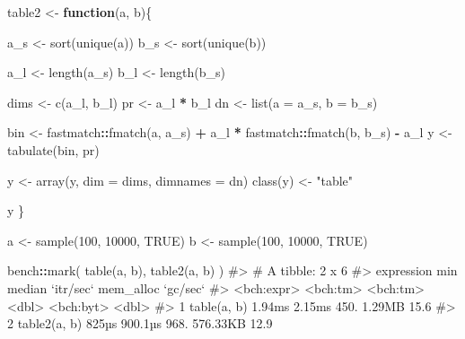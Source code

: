 \documentclass[
]{krantz}
\makeatletter
\newenvironment{Shaded}{\begin{snugshade}}{\end{snugshade}}
\newcommand{\CommentTok}[1]{\textcolor[rgb]{0.56,0.35,0.01}{\textit{#1}}}
\newcommand{\ControlFlowTok}[1]{\textcolor[rgb]{0.13,0.29,0.53}{\textbf{#1}}}
\newcommand{\DataTypeTok}[1]{\textcolor[rgb]{0.13,0.29,0.53}{#1}}
\newcommand{\DecValTok}[1]{\textcolor[rgb]{0.00,0.00,0.81}{#1}}
\newcommand{\KeywordTok}[1]{\textcolor[rgb]{0.13,0.29,0.53}{\textbf{#1}}}
\newcommand{\NormalTok}[1]{#1}
\newcommand{\OperatorTok}[1]{\textcolor[rgb]{0.81,0.36,0.00}{\textbf{#1}}}
\newcommand{\OtherTok}[1]{\textcolor[rgb]{0.56,0.35,0.01}{#1}}
\newcommand{\StringTok}[1]{\textcolor[rgb]{0.31,0.60,0.02}{#1}}
\newenvironment{kframe}{%
\medskip{}
\setlength{\fboxsep}{.8em}
 \def\at@end@of@kframe{}%
 \ifinner\ifhmode%
  \def\at@end@of@kframe{\end{minipage}}%
  \begin{minipage}{\columnwidth}%
 \fi\fi%
 \def\FrameCommand##1{\hskip\@totalleftmargin \hskip-\fboxsep
 \colorbox{shadecolor}{##1}\hskip-\fboxsep
     \hskip-\linewidth \hskip-\@totalleftmargin \hskip\columnwidth}%
 \MakeFramed {\advance\hsize-\width
   \@totalleftmargin\z@ \linewidth\hsize
   \@setminipage}}%
 {\par\unskip\endMakeFramed%
 \at@end@of@kframe}
\renewenvironment{Shaded}{\begin{kframe}}{\end{kframe}}
\renewcommand{\KeywordTok} [1]{\textcolor[rgb]{0.00,0.44,0.13}{{#1}}}
\renewcommand{\DataTypeTok}[1]{\textcolor[rgb]{0.56,0.13,0.00}{{#1}}}
\renewcommand{\DecValTok}  [1]{\textcolor[rgb]{0.25,0.63,0.44}{{#1}}}
\renewcommand{\StringTok}  [1]{\textcolor[rgb]{0.25,0.44,0.63}{{#1}}}
\renewcommand{\CommentTok} [1]{\textcolor[rgb]{0.38,0.63,0.69}{{#1}}}
\renewcommand{\OtherTok}   [1]{\textcolor[rgb]{0.00,0.44,0.13}{{#1}}}
\renewcommand{\NormalTok}  [1]{{#1}}
\makeatother
\begin{document}
\begin{Shaded}
\begin{Highlighting}[]
\NormalTok{table2 <-}\StringTok{ }\ControlFlowTok{function}\NormalTok{(a, b)\{}
  
\NormalTok{  a_s <-}\StringTok{ }\KeywordTok{sort}\NormalTok{(}\KeywordTok{unique}\NormalTok{(a))}
\NormalTok{  b_s <-}\StringTok{ }\KeywordTok{sort}\NormalTok{(}\KeywordTok{unique}\NormalTok{(b))}
  
\NormalTok{  a_l <-}\StringTok{ }\KeywordTok{length}\NormalTok{(a_s)}
\NormalTok{  b_l <-}\StringTok{ }\KeywordTok{length}\NormalTok{(b_s)}
  
\NormalTok{  dims <-}\StringTok{ }\KeywordTok{c}\NormalTok{(a_l, b_l)}
\NormalTok{  pr <-}\StringTok{ }\NormalTok{a_l }\OperatorTok{*}\StringTok{ }\NormalTok{b_l}
\NormalTok{  dn <-}\StringTok{ }\KeywordTok{list}\NormalTok{(}\DataTypeTok{a =}\NormalTok{ a_s, }\DataTypeTok{b =}\NormalTok{ b_s)}
  
\NormalTok{  bin <-}\StringTok{ }\NormalTok{fastmatch}\OperatorTok{::}\KeywordTok{fmatch}\NormalTok{(a, a_s) }\OperatorTok{+}
\StringTok{    }\NormalTok{a_l }\OperatorTok{*}\StringTok{ }\NormalTok{fastmatch}\OperatorTok{::}\KeywordTok{fmatch}\NormalTok{(b, b_s) }\OperatorTok{-}\StringTok{ }\NormalTok{a_l}
\NormalTok{  y <-}\StringTok{ }\KeywordTok{tabulate}\NormalTok{(bin, pr)}
  
\NormalTok{  y <-}\StringTok{ }\KeywordTok{array}\NormalTok{(y, }\DataTypeTok{dim =}\NormalTok{ dims, }\DataTypeTok{dimnames =}\NormalTok{ dn)}
  \KeywordTok{class}\NormalTok{(y) <-}\StringTok{ "table"}
  
\NormalTok{  y}
\NormalTok{\}}

\NormalTok{a <-}\StringTok{ }\KeywordTok{sample}\NormalTok{(}\DecValTok{100}\NormalTok{, }\DecValTok{10000}\NormalTok{, }\OtherTok{TRUE}\NormalTok{)}
\NormalTok{b <-}\StringTok{ }\KeywordTok{sample}\NormalTok{(}\DecValTok{100}\NormalTok{, }\DecValTok{10000}\NormalTok{, }\OtherTok{TRUE}\NormalTok{)}

\NormalTok{bench}\OperatorTok{::}\KeywordTok{mark}\NormalTok{(}
  \KeywordTok{table}\NormalTok{(a, b),}
  \KeywordTok{table2}\NormalTok{(a, b)}
\NormalTok{)}
\CommentTok{#> # A tibble: 2 x 6}
\CommentTok{#>   expression        min   median `itr/sec` mem_alloc `gc/sec`}
\CommentTok{#>   <bch:expr>   <bch:tm> <bch:tm>     <dbl> <bch:byt>    <dbl>}
\CommentTok{#> 1 table(a, b)    1.94ms   2.15ms      450.    1.29MB     15.6}
\CommentTok{#> 2 table2(a, b)    825µs  900.1µs      968.  576.33KB     12.9}
\end{Highlighting}
\end{Shaded}
\end{document}
